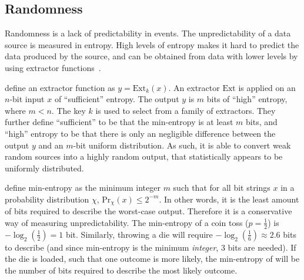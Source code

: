 \subsection{Randomness}\label{sub:prelims_randomness}

Randomness is a lack of predictability in events.
The unpredictability of a data source is measured in entropy.
High levels of entropy makes it hard to predict the data produced by the source, and can be obtained from data with lower levels by using extractor functions~\cite{pseudorandomness}.

\citet{bonneau2015bitcoin} define an extractor function as $y = \text{Ext}_k(x)$.
An extractor $\text{Ext}$ is applied on an $n$-bit input $x$ of \enquote{sufficient} entropy.
The output $y$ is $m$ bits of \enquote{high} entropy, where $m < n$. The key $k$ is used to select from a family of extractors.
They further define \enquote{sufficient} to be that the min-entropy is at least $m$ bits, and \enquote{high} entropy to be that there is only an negligible difference between the output $y$ and an $m$-bit uniform distribution.
As such, it is able to convert weak random sources into a highly random output, that statistically appears to be uniformly distributed.


\citet{dodis2004randomness} define min-entropy as the minimum integer $m$ such that for all bit strings $x$ in a probability distribution $\chi$, $\text{Pr}_\chi(x) \leq 2^{-m}$.
In other words, it is the least amount of bits required to describe the worst-case output.
Therefore it is a conservative way of measuring unpredictability.
The min-entropy of a coin toss ($p = \frac{1}{2}$) is $-\log_2(\frac{1}{2}) = 1$ bit. Similarly, throwing a die will require $-\log_2(\frac{1}{6}) \approx 2.6$ bits to describe (and since min-entropy is the minimum \emph{integer}, 3 bits are needed).
If the die is loaded, such that one outcome is more likely, the min-entropy of will be the number of bits required to describe the most likely outcome.

